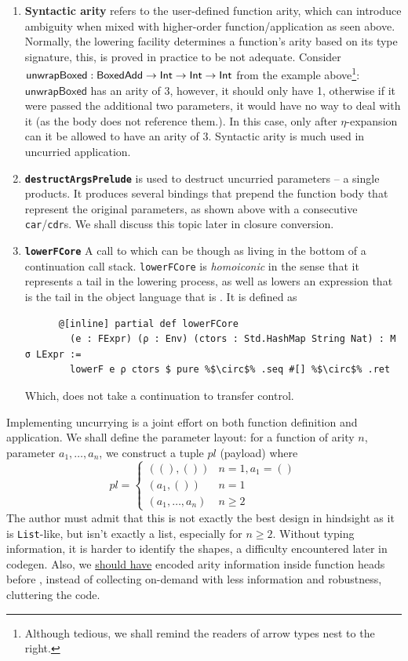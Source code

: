 \documentclass[a4paper, 11pt]{article}
\theoremstyle{remark}\newtheorem*{remark}{Remark}
\theoremstyle{definition}\newtheorem*{definition}{Definition}
\begin{document}
\begin{enumerate}
\item {\bf Syntactic arity} refers to the user-defined function arity,
  which can introduce ambiguity when
  mixed with higher-order function/application as seen above. Normally, the lowering facility determines a function's arity based on its type signature, this, is proved in practice to be not
  adequate. Consider $\mathsf{unwrapBoxed} : \mathsf{BoxedAdd}\to\mathsf{Int}\to\mathsf{Int}\to\mathsf{Int}$ from the example above\footnote{Although tedious, we shall remind the readers of arrow types nest to the right.}:
  $\mathsf{unwrapBoxed}$ has an arity of 3, however, it should only have 1, otherwise if it were passed
  the additional two parameters,
  it would have no way to deal with it (as the body does not reference them.). In this case, only after
  $\eta$-expansion can it be allowed to have an arity of 3.
  Syntactic arity is much used in uncurried application.

\item {\bf \texttt{destructArgsPrelude}} is used to destruct uncurried parameters -- a single products.
  It produces several bindings that prepend the function body that represent the original
  parameters, as shown above with a consecutive \texttt{car}/\texttt{cdr}s.
  We shall discuss this topic later in closure conversion.

\item {\bf \texttt{lowerFCore}} A call to which can be though as living in the bottom of a
  continuation call stack. \texttt{lowerFCore} is \textit{homoiconic} in the sense that it represents
  a tail in the lowering process, as well as lowers an expression that is the tail
  in the object language that is \Lambdair. It is defined as
    \begin{verbatim}
      @[inline] partial def lowerFCore
        (e : FExpr) (ρ : Env) (ctors : Std.HashMap String Nat) : M σ LExpr :=
        lowerF e ρ ctors $ pure %$\circ$% .seq #[] %$\circ$% .ret
    \end{verbatim}
  Which, does not take a continuation to transfer control.
\end{enumerate}

Implementing uncurrying is a joint effort
on both function definition and application. We shall define the parameter layout: for a function of arity $n$, parameter $a_1,\dots,a_n$, we construct
a tuple $pl$ (payload) where
\[
pl =
\begin{cases}
  ((), ()) & n = 1, a_1 = ()\\
  (a_1, ()) & n = 1\\
  (a_1,\dots,a_n) & n \ge 2
\end{cases}
\]
The author must admit that this is not exactly the best design in hindsight as it is \texttt{List}-like,
but isn't exactly a list, especially for $n\ge 2$. Without typing information, it is harder to identify
the shapes, a difficulty encountered later in codegen.
Also, we \underline{should have} encoded arity information inside
function heads before \Lambdair,
instead of collecting on-demand with less information and robustness, cluttering the code.
\end{document}
